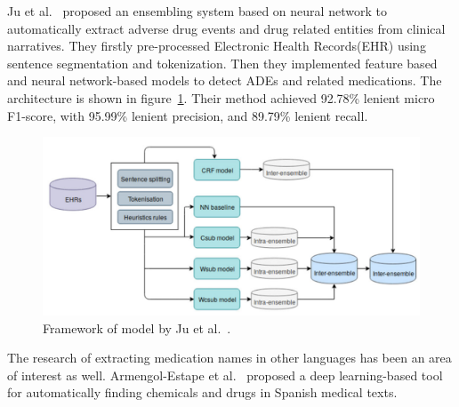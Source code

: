 Ju et al.~\cite{ju2020ensemble} proposed an ensembling system based on neural network to automatically extract adverse drug events and drug related entities from clinical narratives. They firstly pre-processed Electronic Health Records(EHR) using sentence segmentation and tokenization. Then they implemented feature based and neural network-based models to detect ADEs and related medications. The architecture is shown in figure~\ref{fig:architecture-ju}. Their method achieved 92.78\% lenient micro F1-score, with 95.99\% lenient precision, and 89.79\% lenient recall.

\begin{figure}[h]
	\centering
	\includegraphics[width=0.99\linewidth]{Figures/c.png}
	\caption{Framework of model by Ju et al.~\cite{ju2020ensemble}.}
	\label{fig:architecture-ju}
\end{figure}

The research of extracting medication names in other languages has been an area of interest as well. Armengol-Estape et al.~\cite{armengol2019pharmaconer} proposed a deep learning-based tool for automatically finding chemicals and drugs in Spanish medical texts.